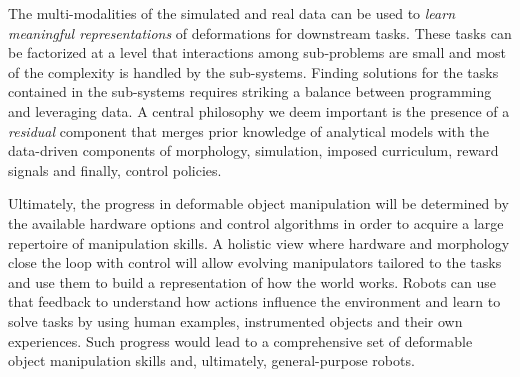 \documentclass[\home/main.tex]{subfiles}
\begin{document}
The multi-modalities of the simulated and real data can be used to \emph{learn meaningful representations} of deformations for downstream tasks.
These tasks can be factorized at a level that interactions among sub-problems are small and most of the complexity is handled by the sub-systems. %
Finding solutions for the tasks contained in the sub-systems requires striking a balance between programming and leveraging data. A central philosophy we deem important is the presence of a \emph{residual} component that merges prior knowledge of analytical models with the data-driven components of morphology, simulation, imposed curriculum, reward signals and finally, control policies.

Ultimately, the progress in deformable object manipulation will be determined by the available hardware options and control algorithms in order to acquire a large repertoire of manipulation skills. A holistic view where hardware and morphology close the loop with control will allow evolving manipulators tailored to the tasks and use them to build a representation of how the world works.
Robots can use that feedback to understand how actions influence the environment and learn to solve tasks by using human examples, instrumented objects and their own experiences. Such progress would lead to a comprehensive set of deformable object manipulation skills and, ultimately, general-purpose robots.


\end{document}
